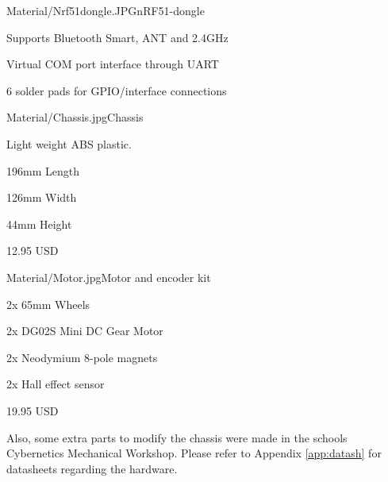 \newpage
{}
\begin{material}{Material/Nrf51dongle.JPG}{nRF51-dongle}
\item Supports Bluetooth Smart, ANT and 2.4GHz
\item Virtual COM port interface through UART
\item 6 solder pads for GPIO/interface connections
\end{material}

\begin{material}{Material/Chassis.jpg}{Chassis}
\item Light weight ABS plastic.
\item 196mm Length 
\item 126mm Width 
\item 44mm Height
\item 12.95 USD
\end{material}

\begin{material}{Material/Motor.jpg}{Motor and encoder kit}
\item 2x 65mm Wheels
\item 2x DG02S Mini DC Gear Motor
\item 2x Neodymium 8-pole magnets
\item 2x Hall effect sensor
\item 19.95 USD
\end{material}

Also, some extra parts to modify the chassis were made in the schools Cybernetics Mechanical Workshop. Please refer to Appendix \ref{app:datash} for datasheets regarding the hardware.